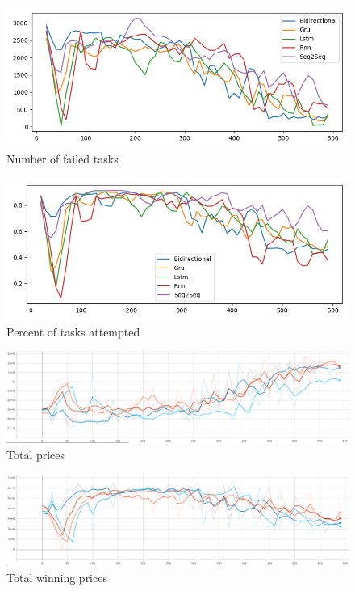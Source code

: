 \begin{figure}[H]
    \centering
    \includegraphics[width=\linewidth]{figures/5_evaluation_figs/net_arch_training_fig/num_failed_tasks.png}
    \caption{Number of failed tasks}
    \label{fig:net_arch_num_failed_tasks}
\end{figure}

\begin{figure}[H]
    \centering
    \includegraphics[width=\linewidth]{figures/5_evaluation_figs/net_arch_training_fig/percent_tasks.png}
    \caption{Percent of tasks attempted}
    \label{fig:net_arch_percent_tasks}
\end{figure}

\begin{figure}[H]
    \centering
    \includegraphics[width=\linewidth]{figures/5_evaluation_figs/net_arch_training_fig/total_prices.png}
    \caption{Total prices}
    \label{fig:net_arch_total_prices}
\end{figure}

\begin{figure}[H]
    \centering
    \includegraphics[width=\linewidth]{figures/5_evaluation_figs/net_arch_training_fig/total_winning_prices.png}
    \caption{Total winning prices}
    \label{fig:net_arch_total_winning_prices}
\end{figure}

